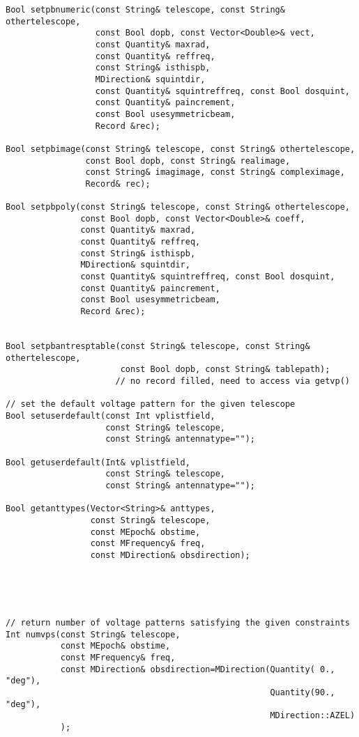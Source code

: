 \documentclass[12pt]{article}
\begin{document}
{\begin{verbatim}
Bool setpbnumeric(const String& telescope, const String& othertelescope,
                  const Bool dopb, const Vector<Double>& vect,
                  const Quantity& maxrad,
                  const Quantity& reffreq,
                  const String& isthispb,
                  MDirection& squintdir,
                  const Quantity& squintreffreq, const Bool dosquint,
                  const Quantity& paincrement,
                  const Bool usesymmetricbeam,
                  Record &rec);

Bool setpbimage(const String& telescope, const String& othertelescope, 
                const Bool dopb, const String& realimage, 
                const String& imagimage, const String& compleximage, 
                Record& rec);

Bool setpbpoly(const String& telescope, const String& othertelescope,
               const Bool dopb, const Vector<Double>& coeff,
               const Quantity& maxrad,
               const Quantity& reffreq,
               const String& isthispb,
               MDirection& squintdir,
               const Quantity& squintreffreq, const Bool dosquint,
               const Quantity& paincrement,
               const Bool usesymmetricbeam,
               Record &rec);


Bool setpbantresptable(const String& telescope, const String& othertelescope,
                       const Bool dopb, const String& tablepath);
                      // no record filled, need to access via getvp()

// set the default voltage pattern for the given telescope
Bool setuserdefault(const Int vplistfield,
                    const String& telescope,
                    const String& antennatype="");

Bool getuserdefault(Int& vplistfield,
                    const String& telescope,
                    const String& antennatype="");

Bool getanttypes(Vector<String>& anttypes,
                 const String& telescope,
                 const MEpoch& obstime,
                 const MFrequency& freq, 
                 const MDirection& obsdirection); 
                


        
\end{verbatim}


\begin{verbatim}
// return number of voltage patterns satisfying the given constraints
Int numvps(const String& telescope,
           const MEpoch& obstime,
           const MFrequency& freq, 
           const MDirection& obsdirection=MDirection(Quantity( 0., "deg"),
                                                     Quantity(90., "deg"), 
                                                     MDirection::AZEL)
           ); 


\end{verbatim}}
\end{document}
